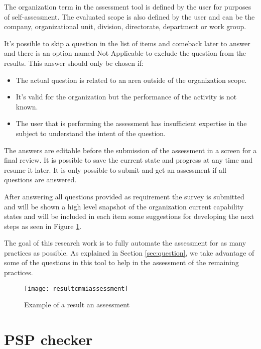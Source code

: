 The organization term in the assessment tool is defined by the user for purposes of  self-assessment. The evaluated scope is also defined by the user and can be the company, organizational unit, division, directorate, department or work group.

It's possible to skip a question in the list of items and comeback later to answer and there is an option named Not Applicable to exclude the question from the results. This answer should only be chosen if:
\begin{itemize}
	\item The actual question is related to an area outside of the organization scope.
	\item It's valid for the organization but the  performance of the activity is not known.
	\item The user that is performing the assessment has insufficient expertise in the subject to understand the intent of the question.
\end{itemize}

The answers are editable before the submission of the assessment in a screen for a final review. It is possible to save the current state and progress at any time and resume it later. It is only possible to submit and get an assessment if all questions are answered.

After answering all questions provided as requirement the survey is submitted and will be shown a high level snapshot of the organization  current capability states and will be included in each item some suggestions for developing the next steps as seen in Figure \ref{fig:assesment_result}.

The goal of this research work is to fully automate the assessment for as many practices as possible. As explained in Section \ref{sec:question}, we take advantage of some of the questions in this tool to help in the assessment of the remaining practices.

\newpage 

\begin{figure}[h]
	\begin{center}
		\leavevmode
		\texttt{[image: resultcmmiassessment]}
		\caption{Example of a result an assessment}
		\label{fig:assesment_result}
	\end{center}
\end{figure}


\section{PSP checker}

